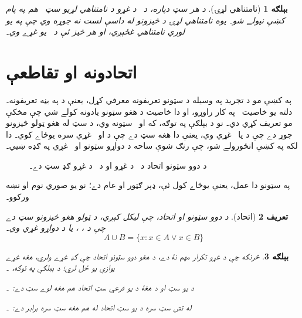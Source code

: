 \documentclass[12pt,a4paper]{article}
\newcommand{\Setabs}[2]{\{#1 : #2\}}
\newcommand{\olfileid}[3]{\gdef\pspart{#1}\gdef\pschapter{#2}\gdef\pssection{#3}}
\newcommand{\olsection}[1]{\section{#1}\label{\pspart:\pschapter:\pssection:sec}}
\newcommand{\ollabel}[1]{\label{\pspart:\pschapter:\pssection:#1}}
\newcommand{\olasset}[1]{\centering\begin{LTR}\centering\resizebox{.46\textwidth}{!}{}\end{LTR}}
\newenvironment{explain}{}{}
\newtheorem{defn}{تعريف}[section]
\newtheorem{ex}[defn]{بېلګه}
\begin{document}
\begin{ex}[نامتناهي لړۍ]
د هر سټ  دپاره، د~ د غړو د نامتناهي لړيو سټ~ هم په پام کښې نيولے شو۔ يوه نامتناهي لړۍ  د څيزونو له داسې لست نه جوړه وي چې په يو لوري نامتناهي غځېږي، او هر څيز ئې د~ يو غړے وي۔
\end{ex}



\olfileid{sfr}{set}{uni}
\olsection{اتحادونه او تقاطعې}

\begin{explain}
په  کښې مو د تجريد په وسيله د سټونو تعريفونه معرفي کړل، يعنې د \LR{$\Setabs{x}{\phi(x)}$} په بڼه تعريفونه۔ دلته يو خاصيت~\LR{$\phi$} په کار راوړو، او دا خاصيت د هغو سټونو يادونه کولے شي چې مخکې مو تعريف کړي دي۔ نو د بېلګې په توګه، که  او~ سټونه وي، د \LR{$\Setabs{x}{x \in A \lor x \in B}$} سټ له هغو ټولو څيزونو جوړ دے چې د  يا~ غړي وي، يعنې دا هغه سټ دے چې د  او~ غړي سره يوځاے کوي۔ دا لکه په  کښې انځورولے شو، چې رنګ شوې ساحه د دواړو سټونو  او~ غړي په ګډه ښيي۔

\begin{figure}
  \olasset{assets/diagrams/union.tikz}
  \caption{د دوو سټونو اتحاد  د~ د غړو او د~ د غړو ګډ سټ دے۔}
  \ollabel{fig:union}
\end{figure}

په سټونو دا عمل، يعنې يوځاے کول ئې، ډېر ګټور او عام دے؛ نو يو صوري نوم او نښه ورکوو۔
\end{explain}

\begin{defn}[اتحاد]
د دوو سټونو  او  \emph{اتحاد}، چې  ليکل کېږي، د ټولو هغو څيزونو سټ دے چې د ، ، يا د دواړو غړي وي۔
\[
A \cup B = \Setabs{x}{x \in A \lor x \in B}
\]
\end{defn}

\begin{ex}
څرنګه چې د غړو تکرار مهم نۀ دے، د هغو دوو سټونو اتحاد چې ګډ غړے ولري، هغه غړے يوازې يو ځل لري؛ د بېلګې په توګه، ۔

د يو سټ او د هغۀ د يو فرعي سټ اتحاد هم هغه لوے سټ دے: ۔

له تش سټ سره د يو سټ اتحاد له هم هغه سټ سره برابر دے: ۔
\end{ex}
\end{document}
